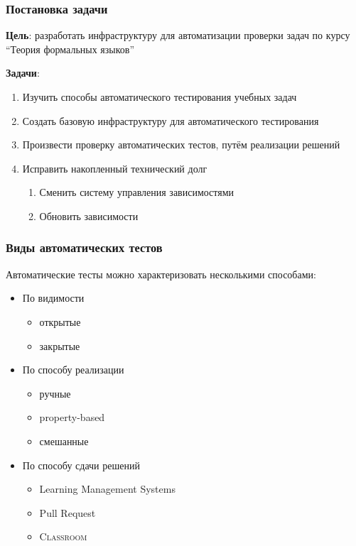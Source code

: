 \documentclass[aspectratio=169]{beamer}
\begin{document}
\begin{frame}
	\frametitle{Постановка задачи}
	\textbf{Цель}: разработать инфраструктуру для автоматизации проверки задач по курсу \enquote{Теория формальных языков}

	\textbf{Задачи}:
	\begin{enumerate}
		\item Изучить способы автоматического тестирования учебных задач
		\item Создать базовую инфраструктуру для автоматического тестирования
		\item Произвести проверку автоматических тестов, путём реализации решений
		\item Исправить накопленный технический долг
		      \begin{enumerate}
			      \item Сменить систему управления зависимостями
			      \item Обновить зависимости
		      \end{enumerate}
	\end{enumerate}
\end{frame}

\begin{frame}
	\frametitle{Виды автоматических тестов}

	Автоматические тесты можно характеризовать несколькими способами:
	\begin{itemize}
		\item По видимости
		      \begin{itemize}
			      \item открытые
			      \item закрытые
		      \end{itemize}
		\item По способу реализации
		      \begin{itemize}
			      \item ручные
			      \item property-based
			      \item смешанные
		      \end{itemize}
		\item По способу сдачи решений
		      \begin{itemize}
			      \item Learning Management Systems
			      \item Pull Request
			      \item \GitHub{} \textsc{Classroom}
		      \end{itemize}
	\end{itemize}
\end{frame}
\end{document}

